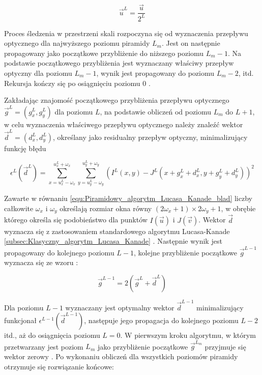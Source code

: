 \begin{equation}
\label{equ:Piramidowy_algorytm_Lucasa_Kanade_wspolrzedne}
	\vec{u}^L = \frac{\vec{u}}{2^L}
\end{equation}

Proces śledzenia w przestrzeni skali rozpoczyna się od wyznaczenia przepływu optycznego dla najwyższego poziomu piramidy $L_m$. Jest on następnie propagowany jako początkowe przybliżenie do niższego poziomu $L_m - 1$. Na podstawie początkowego przybliżenia jest wyznaczany właściwy przepływ optyczny dla poziomu $L_m - 1$, wynik jest propagowany do poziomu $L_m -2$, itd. Rekursja kończy się po osiągnięciu poziomu 0 \cite{Bouguet2000}.

Zakładając znajomość początkowego przybliżenia przepływu optycznego $\vec{g}^L = (g_x^L, g_y^L)$ dla poziomu $L$, na podstawie obliczeń od poziomu $L_m$ do $L + 1$, w celu wyznaczenia właściwego przepływu optycznego należy znaleźć wektor $\vec{d}^L = (d_x^L, d_y^L)$, określany jako residualny przepływ optyczny, minimalizujący funkcję błędu \cite{Bouguet2000}

\begin{equation}
\label{equ:Piramidowy_algorytm_Lucasa_Kanade_blad}
	\epsilon^L(\vec{d}^L) = \sum_{x = u_x^L-\omega_x}^{u_x^L + \omega_x} \sum_{y = u_y^L-\omega_y}^{u_y^L + \omega_y} ( I^L(x,y) - J^L(x + g_x^L + d_x^L, y + g_y^L + d_y^L) )^2
\end{equation}

Zawarte w równaniu \ref{equ:Piramidowy_algorytm_Lucasa_Kanade_blad} liczby całkowite $\omega_x$ i $\omega_y$ określają rozmiar okna równy $(2\omega_x + 1) \times 2\omega_y + 1$, w obrębie którego określa się podobieństwo dla punktów $I(\vec{u})$ i $J(\vec{v})$. Wektor $\vec{d}$ wyznacza się z zastosowaniem standardowego algorytmu Lucasa-Kanade \ref{subsec:Klasyczny_algorytm_Lucasa_Kanade} \cite{Bouguet2000}. Następnie wynik jest propagowany do kolejnego poziomu $L-1$, kolejne przybliżenie początkowe $\vec{g}^{L-1}$ wyznacza się ze wzoru \cite{Bouguet2000}:

\begin{equation}
\label{equ:Piramidowy_algorytm_Lucasa_Kanade_propagacja_przeplywu}
	\vec{g}^{L-1} = 2(\vec{g}^L + \vec{d}^L)
\end{equation} 

Dla poziomu $L-1$ wyznaczany jest optymalny wektor $\vec{d}^{L-1}$ minimalizujący funkcjonał $\epsilon^{L-1}(\vec{d}^{L-1})$, następuje jego propagacja do kolejnego poziomu $L-2$ itd., aż do osiągnięcia poziomu $L = 0$. W pierwszym kroku algorytmu, w którym przetwarzany jest poziom $L_m$ jako przybliżenie początkowe $\vec{g}^{L_m}$ przyjmuje się wektor zerowy \cite{Bouguet2000}. Po wykonaniu obliczeń dla wszystkich poziomów piramidy otrzymuje się rozwiązanie końcowe:

